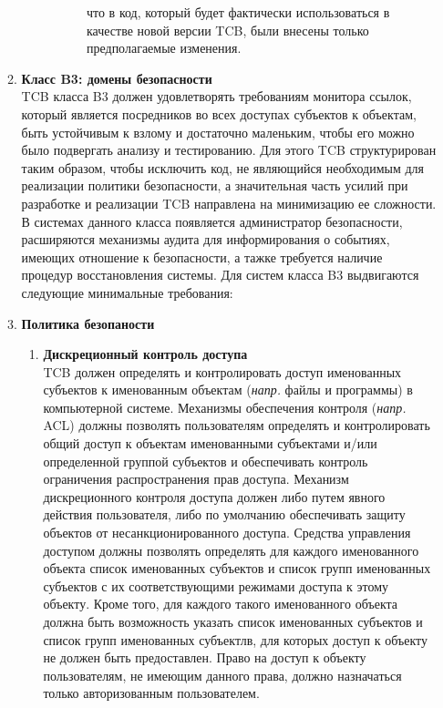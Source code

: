 \begin{enumerate}
\begin{enumerate}
\begin{enumerate}
\begin{enumerate}
\begin{itemize}
					что в код, который будет фактически использоваться в качестве новой версии TCB, были внесены только предполагаемые изменения.
				\end{itemize}
			\end{enumerate}
		\end{enumerate}
		\item{\textbf{Класс B3: домены безопасности}}\\
		TCB класса B3 должен удовлетворять требованиям монитора ссылок, который является посредников во всех доступах субъектов к объектам, быть устойчивым к взлому и достаточно маленьким, 
		чтобы его можно было подвергать анализу и тестированию. Для этого TCB структурирован таким образом, чтобы исключить код, не являющийся необходимым для реализации политики безопасности, 
		а значительная часть усилий при разработке и реализации TCB направлена на минимизацию ее сложности. В системах данного класса появляется администратор безопасности, расширяются механизмы 
		аудита для информирования о событиях, имеющих отношение к безопасности, а тажке требуется наличие процедур восстановления системы. Для систем класса B3 выдвигаются следующие минимальные 
		требования:
		\item{\textbf{Политика безопаности}}
		\begin{enumerate}
			\item{\textbf{Дискреционный контроль доступа}}\\
			TCB должен определять и контролировать доступ именованных субъектов к именованным объектам (\textit{напр.} файлы и программы) в компьютерной системе. Механизмы обеспечения контроля
			(\textit{напр.} ACL) должны позволять пользователям определять и контролировать общий доступ к объектам именованными субъектами и/или определенной группой субъектов и обеспечивать 
			контроль ограничения распространения прав доступа. Механизм дискреционного контроля доступа должен либо путем явного действия пользователя, либо по умолчанию обеспечивать защиту 
			объектов от несанкционированного доступа. Средства управления доступом должны позволять определять для каждого именованного объекта список именованных субъектов и список групп 
			именованных субъектов с их соответствующими режимами доступа к этому объекту. Кроме того, для каждого такого именованного объекта должна быть возможность указать список
			именованных субъектов и список групп именованных субъектлв, для которых доступ к объекту не должен быть предоставлен. Право на доступ к объекту пользователям, не имеющим 
			данного права, должно назначаться только авторизованным пользователем.

\end{enumerate}
\end{enumerate}
\end{enumerate}
